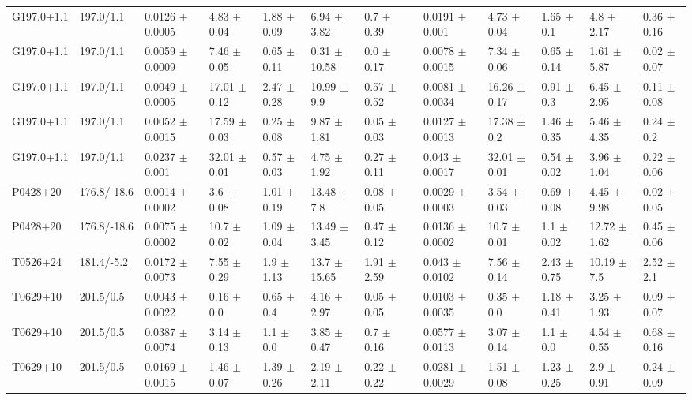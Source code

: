 \documentclass[preprint]{emulateapj}
\begin{document}
\begin{table}
\begin{tabular}{ lllllllclllll  }
G197.0+1.1 & 197.0/1.1 & 0.0126 $\pm$ 0.0005 & 4.83 $\pm$ 0.04 & 1.88 $\pm$ 0.09 & 6.94 $\pm$ 3.82 & 0.7 $\pm$ 0.39 & &  0.0191 $\pm$ 0.001 & 4.73 $\pm$ 0.04 & 1.65 $\pm$ 0.1 & 4.8 $\pm$ 2.17 & 0.36 $\pm$ 0.16 \\
G197.0+1.1 & 197.0/1.1 & 0.0059 $\pm$ 0.0009 & 7.46 $\pm$ 0.05 & 0.65 $\pm$ 0.11 & 0.31 $\pm$ 10.58 & 0.0 $\pm$ 0.17 & &  0.0078 $\pm$ 0.0015 & 7.34 $\pm$ 0.06 & 0.65 $\pm$ 0.14 & 1.61 $\pm$ 5.87 & 0.02 $\pm$ 0.07 \\
G197.0+1.1 & 197.0/1.1 & 0.0049 $\pm$ 0.0005 & 17.01 $\pm$ 0.12 & 2.47 $\pm$ 0.28 & 10.99 $\pm$ 9.9 & 0.57 $\pm$ 0.52 & &  0.0081 $\pm$ 0.0034 & 16.26 $\pm$ 0.17 & 0.91 $\pm$ 0.3 & 6.45 $\pm$ 2.95 & 0.11 $\pm$ 0.08 \\
G197.0+1.1 & 197.0/1.1 & 0.0052 $\pm$ 0.0015 & 17.59 $\pm$ 0.03 & 0.25 $\pm$ 0.08 & 9.87 $\pm$ 1.81 & 0.05 $\pm$ 0.03 & &  0.0127 $\pm$ 0.0013 & 17.38 $\pm$ 0.2 & 1.46 $\pm$ 0.35 & 5.46 $\pm$ 4.35 & 0.24 $\pm$ 0.2 \\
G197.0+1.1 & 197.0/1.1 & 0.0237 $\pm$ 0.001 & 32.01 $\pm$ 0.01 & 0.57 $\pm$ 0.03 & 4.75 $\pm$ 1.92 & 0.27 $\pm$ 0.11 & &  0.043 $\pm$ 0.0017 & 32.01 $\pm$ 0.01 & 0.54 $\pm$ 0.02 & 3.96 $\pm$ 1.04 & 0.22 $\pm$ 0.06 \\
P0428+20 & 176.8/-18.6 & 0.0014 $\pm$ 0.0002 & 3.6 $\pm$ 0.08 & 1.01 $\pm$ 0.19 & 13.48 $\pm$ 7.8 & 0.08 $\pm$ 0.05 & &  0.0029 $\pm$ 0.0003 & 3.54 $\pm$ 0.03 & 0.69 $\pm$ 0.08 & 4.45 $\pm$ 9.98 & 0.02 $\pm$ 0.05 \\
P0428+20 & 176.8/-18.6 & 0.0075 $\pm$ 0.0002 & 10.7 $\pm$ 0.02 & 1.09 $\pm$ 0.04 & 13.49 $\pm$ 3.45 & 0.47 $\pm$ 0.12 & &  0.0136 $\pm$ 0.0002 & 10.7 $\pm$ 0.01 & 1.1 $\pm$ 0.02 & 12.72 $\pm$ 1.62 & 0.45 $\pm$ 0.06 \\
T0526+24 & 181.4/-5.2 & 0.0172 $\pm$ 0.0073 & 7.55 $\pm$ 0.29 & 1.9 $\pm$ 1.13 & 13.7 $\pm$ 15.65 & 1.91 $\pm$ 2.59 & &  0.043 $\pm$ 0.0102 & 7.56 $\pm$ 0.14 & 2.43 $\pm$ 0.75 & 10.19 $\pm$ 7.5 & 2.52 $\pm$ 2.1 \\
T0629+10 & 201.5/0.5 & 0.0043 $\pm$ 0.0022 & 0.16 $\pm$ 0.0 & 0.65 $\pm$ 0.4 & 4.16 $\pm$ 2.97 & 0.05 $\pm$ 0.05 & &  0.0103 $\pm$ 0.0035 & 0.35 $\pm$ 0.0 & 1.18 $\pm$ 0.41 & 3.25 $\pm$ 1.93 & 0.09 $\pm$ 0.07 \\
T0629+10 & 201.5/0.5 & 0.0387 $\pm$ 0.0074 & 3.14 $\pm$ 0.13 & 1.1 $\pm$ 0.0 & 3.85 $\pm$ 0.47 & 0.7 $\pm$ 0.16 & &  0.0577 $\pm$ 0.0113 & 3.07 $\pm$ 0.14 & 1.1 $\pm$ 0.0 & 4.54 $\pm$ 0.55 & 0.68 $\pm$ 0.16 \\
T0629+10 & 201.5/0.5 & 0.0169 $\pm$ 0.0015 & 1.46 $\pm$ 0.07 & 1.39 $\pm$ 0.26 & 2.19 $\pm$ 2.11 & 0.22 $\pm$ 0.22 & &  0.0281 $\pm$ 0.0029 & 1.51 $\pm$ 0.08 & 1.23 $\pm$ 0.25 & 2.9 $\pm$ 0.91 & 0.24 $\pm$ 0.09 \\

\end{tabular}
\end{table}
\end{document}
